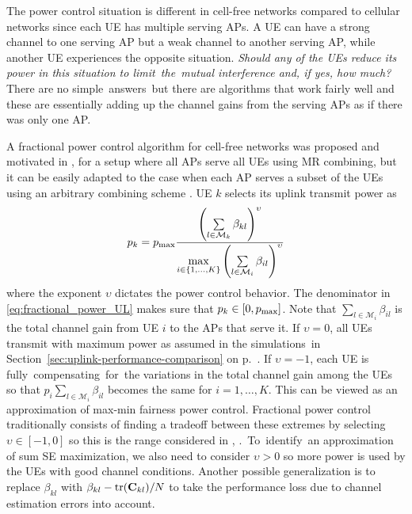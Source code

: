 The power control situation is different in cell-free networks compared to cellular networks since each UE has multiple serving APs. A UE can have a strong channel to one serving AP but a weak channel to another serving AP, while another UE experiences the opposite situation. \linebreak \emph{Should any of the UEs reduce its power in this situation to limit~the~mutual interference and, if yes, how much?} There are no simple~answers~but there are algorithms that work fairly well and these are essentially adding up the channel gains from the serving APs as if there was only one AP.

A fractional power control algorithm for cell-free networks was proposed and motivated in \cite{Nikbakht2019a}, \cite{Nikbakht2020a} for a setup where all APs serve all UEs using MR combining, but it can be easily adapted to the case when each AP serves a subset of the UEs using an arbitrary combining scheme \cite{Chen2020a}. UE $k$ selects its uplink transmit power as
\enlargethispage{\baselineskip} 
\begin{align}\label{eq:fractional_power_UL}
p_k= p_{\textrm{max}}\frac{\left(\sum\limits_{l\in\mathcal{M}_k}\beta_{kl}\right)^{\upsilon}}{\underset{i\in\{1,\ldots,K\}}{\max}\left(\sum\limits_{l\in\mathcal{M}_i}\beta_{il}\right)^{\upsilon}}
\end{align}
where the exponent $\upsilon$ dictates the power control behavior. The denominator in \eqref{eq:fractional_power_UL} makes sure that $p_k \in [0,p_{\textrm{max}}]$.
Note that $\sum_{l\in\mathcal{M}_i}\beta_{il}$ is the total channel gain from UE $i$ to the APs that serve it.
If $\upsilon=0$, all UEs transmit with maximum power as assumed in the simulations~in Section~\ref{sec:uplink-performance-comparison} on p.~\pageref{sec:uplink-performance-comparison}. If $\upsilon=-1$, each UE is fully~compensating~for~the variations in the total channel gain among the UEs so that $p_i\sum_{l\in\mathcal{M}_i}\beta_{il}$ becomes the same for  $i=1,\ldots,K$. This can be viewed as an approximation of max-min fairness power control. Fractional power control traditionally consists of finding a tradeoff between these extremes by selecting $\upsilon \in [-1,0]$ so this is the range considered in \cite{Nikbakht2019a}, \cite{Nikbakht2020a}.~To~identify~an approximation of sum SE maximization, we also need to consider $\upsilon > 0$ so more power is used by the UEs with good channel conditions. Another possible generalization is to replace $\beta_{kl}$ with $\beta_{kl}-\mathrm{tr}(\mathbf{C}_{kl})/N$ to take the performance loss due to channel estimation errors into account.

